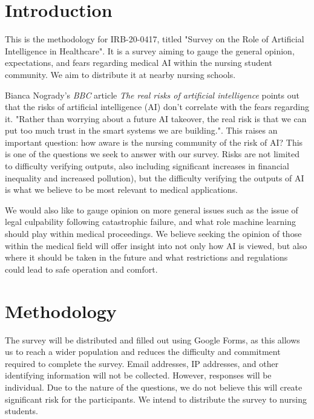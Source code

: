 \documentclass[]{article}
\begin{document}
	
    \section{Introduction}

    This is the methodology for IRB-20-0417, titled "Survey on the Role of Artificial Intelligence in Healthcare". It is a survey aiming to gauge the general opinion, expectations, and fears regarding medical AI within the nursing student community. We aim to distribute it at nearby nursing schools.

    Bianca Nogrady's \emph{BBC} article \emph{The real risks of artificial intelligence} points out that the risks of artificial intelligence (AI) don't correlate with the fears regarding it. "Rather than worrying about a future AI takeover, the real risk is that we can put too much trust in the smart systems we are building."\cite{bbc2016rroai}. This raises an important question: how aware is the nursing community of the risk of AI? This is one of the questions we seek to answer with our survey. Risks are not limited to difficulty verifying outputs, also including significant increases in financial inequality and increased pollution)\cite{emerj2019roawrtiwwa}, but the difficulty verifying the outputs of AI is what we believe to be most relevant to medical applications.

    We would also like to gauge opinion on more general issues such as the issue of legal culpability following catastrophic failure, and what role machine learning should play within medical proceedings. We believe seeking the opinion of those within the medical field will offer insight into not only how AI is viewed, but also where it should be taken in the future and what restrictions and regulations could lead to safe operation and comfort.
    
    \section{Methodology}

    The survey will be distributed and filled out using Google Forms, as this allows us to reach a wider population and reduces the difficulty and commitment required to complete the survey. Email addresses, IP addresses, and other identifying information will not be collected. However, responses will be individual. Due to the nature of the questions, we do not believe this will create significant risk for the participants. We intend to distribute the survey to nursing students.
\end{document}
